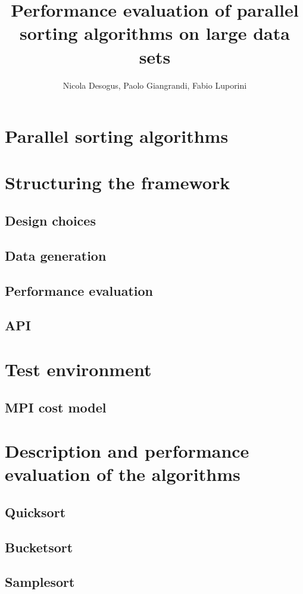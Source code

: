 \documentclass[a4paper,12pt,oneside,openright]{article}
\title{Performance evaluation of parallel sorting algorithms on large data sets}
\author{Nicola Desogus, Paolo Giangrandi, Fabio Luporini}
\begin{document}
\maketitle
\tableofcontents
\pagebreak



\section{Parallel sorting algorithms}

\section{Structuring the framework}
\subsection{Design choices}
\subsection{Data generation}
\subsection{Performance evaluation}
\subsection{API}

\section{Test environment}
\subsection{MPI cost model}

\section{Description and performance evaluation of the algorithms}

\subsection{Quicksort}
\subsection{Bucketsort}
\subsection{Samplesort}
\end{document}
